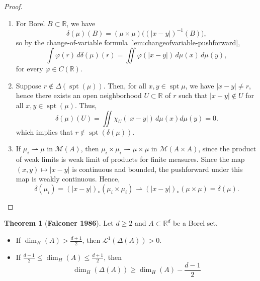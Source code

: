 \documentclass[12pt,a4paper]{report}
\theoremstyle{definition}
\newtheorem{theorem}{Theorem}
\begin{document}
\begin{proof}
\hfill
\begin{enumerate}

\item For Borel \( B \subset \mathbb{R} \), we have
$$
\delta(\mu)(B) = (\mu \times \mu)\big( (|x - y|)^{-1}(B) \big),
$$
so by the change-of-variable formula
\ref{lem:changeofvariable-pushforward},
\[
\int \varphi(r) \, d\delta(\mu)(r) = \iint \varphi(|x - y|) \, d\mu(x) \, d\mu(y),
\]
for every  \( \varphi \in C(\mathbb{R}) \).


\item Suppose \( r \notin \Delta(\operatorname{spt} (\mu)) \). Then, for all \( x, y \in \operatorname{spt} \mu \), we have \( |x - y| \ne r \), hence there exists an open neighborhood \( U \subset \mathbb{R} \) of \( r \) such that \( |x - y| \notin U \) for all \( x, y \in \operatorname{spt} (\mu) \). Thus,
\[
\delta(\mu)(U) = \iint \chi_U(|x - y|) \, d\mu(x) d\mu(y) = 0.
\]
which implies that \( r \notin \operatorname{spt}(\delta(\mu)) \).

\item If \( \mu_i \rightharpoonup \mu \) in \( \mathcal{M}(A) \), then \( \mu_i \times \mu_i \rightharpoonup \mu \times \mu \) in \( \mathcal{M}(A \times A) \), since the product of weak limits is weak limit of products for finite measures. Since the map \( (x, y) \mapsto |x - y| \) is continuous and bounded, the pushforward under this map is weakly continuous. Hence,
\[
\delta(\mu_i) = (|x - y|)_* (\mu_i \times \mu_i) \rightharpoonup (|x - y|)_* (\mu \times \mu) = \delta(\mu).
\]
\end{enumerate}
\end{proof}

\begin{theorem} [\textbf{Falconer 1986}] \label{FalconerThm}
Let \( d \geq 2 \) and \( A \subset \mathbb{R}^d \) be a Borel set.
\begin{itemize}
  \item[(a)] If $ \dim_H(A) > \frac{d+1}{2}$, then \( \mathcal{L}^1(\Delta(A)) > 0. \) \vspace{0.1 cm}
  \item[(b)] If \( \frac{d-1}{2} \leq \dim_H(A) \leq \frac{d+1}{2} \), then
  $$  \dim_H(\Delta(A)) \geq \dim_H(A) - \frac{d - 1}{2}$$
\end{itemize}
\end{theorem}
\end{document}
